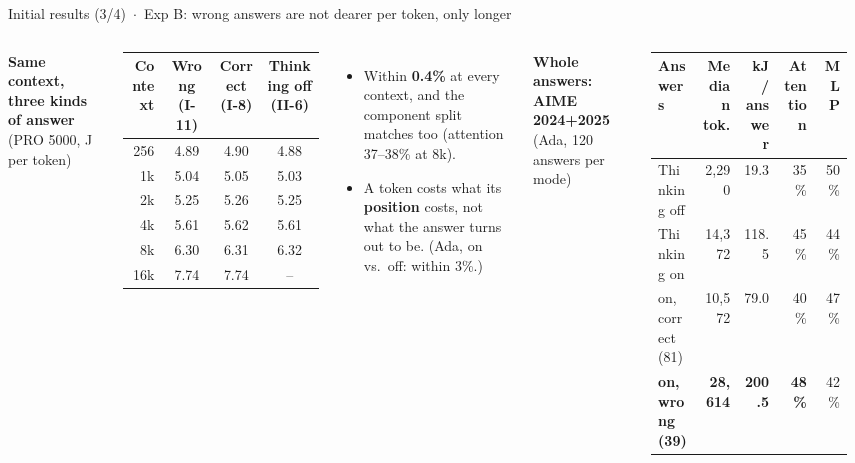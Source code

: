 \documentclass[aspectratio=169,9pt]{beamer}
\newcommand{\hd}[1]{{\color{accent}\bfseries #1}}
\begin{document}
\begin{frame}{Initial results (3/4) \,$\cdot$\, Exp B: wrong answers are not dearer per token, only longer}
  \begin{columns}[T,onlytextwidth]
    \hd{Same context, three kinds of answer} {\scriptsize\color{muted}(PRO 5000, J per token)}\\[2pt]
    \scriptsize
    \begin{tabular}{@{}rccc@{}}
      \toprule
      Context & Wrong (I-11) & Correct (I-8) & Thinking off (II-6) \\
      \midrule
      256 & 4.89 & 4.90 & 4.88 \\
      1k & 5.04 & 5.05 & 5.03 \\
      2k & 5.25 & 5.26 & 5.25 \\
      4k & 5.61 & 5.62 & 5.61 \\
      8k & 6.30 & 6.31 & 6.32 \\
      16k & 7.74 & 7.74 & -- \\
      \bottomrule
    \end{tabular}
    \begin{itemize}\scriptsize
      \item Within \textbf{0.4\%} at every context, and the component split matches too (attention 37--38\% at 8k).
      \item A token costs what its \textbf{position} costs, not what the answer turns out to be. (Ada, on vs.\ off: within 3\%.)
    \end{itemize}
    \hd{Whole answers: AIME 2024+2025} {\scriptsize\color{muted}(Ada, 120 answers per mode)}\\[2pt]
    \scriptsize
    \begin{tabular}{@{}lrrrr@{}}
      \toprule
      Answers & Median tok. & kJ / answer & Attention & MLP \\
      \midrule
      Thinking off & 2{,}290 & 19.3 & 35\% & 50\% \\
      Thinking on & 14{,}372 & 118.5 & 45\% & 44\% \\
      \quad on, correct (81) & 10{,}572 & 79.0 & 40\% & 47\% \\
      \quad \textbf{on, wrong (39)} & \textbf{28{,}614} & \textbf{200.5} & \textbf{48\%} & 42\% \\
      \bottomrule
    \end{tabular}\\[1pt]

\end{columns}
\end{frame}
\end{document}
